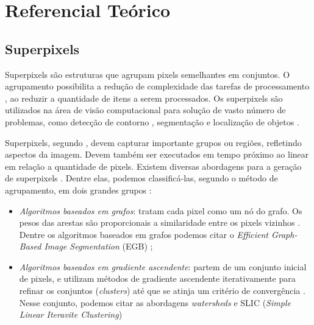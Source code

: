\begin{document}
\section{Referencial Teórico} \label{sec:ref_teorico}


\subsection{Superpixels} \label{ssec:super}

Superpixels são estruturas que agrupam pixels semelhantes em conjuntos. O agrupamento possibilita a redução de complexidade das tarefas de processamento \cite{SLIC}, ao reduzir a quantidade de itens a serem processados. Os superpixels são utilizados na área de visão computacional para solução de vasto número de problemas, como detecção de contorno \cite{CONTOUR}, segmentação \cite{SEG_MERGE} e localização de objetos \cite{SEG_LOCALIZ}.

Superpixels, segundo \cite{FELZENSZWALB}, devem capturar importante grupos ou regiões, refletindo aspectos da imagem. Devem também ser executados em tempo próximo ao linear em relação a quantidade de pixels. Existem diversas abordagens para a geração de superpixels \cite{SLIC}. Dentre elas, podemos classificá-las, segundo o método de agrupamento, em dois grandes grupos \cite{SLIC}: 

\begin{itemize}
 \item \textit{Algoritmos baseados em grafos}: tratam cada pixel como um nó do grafo. Os pesos das arestas são proporcionais a similaridade entre os pixels vizinhos \cite{SLIC}. Dentre os algoritmos baseados em grafos podemos citar o \textit{Efficient Graph-Based Image Segmentation} (EGB) \cite{FELZENSZWALB};
 \item \textit{Algoritmos baseados em gradiente ascendente}: partem de um conjunto inicial de pixels, e utilizam métodos de gradiente ascendente iterativamente para refinar os conjuntos (\textit{clusters}) até que se atinja um critério de convergência \cite{SLIC}. Nesse conjunto, podemos  citar as abordagens \textit{watersheds} \cite{WATERSHEDS} e SLIC (\textit{Simple Linear Iteravite Clustering}) \cite{SLIC}
\end{itemize}

\end{document}
